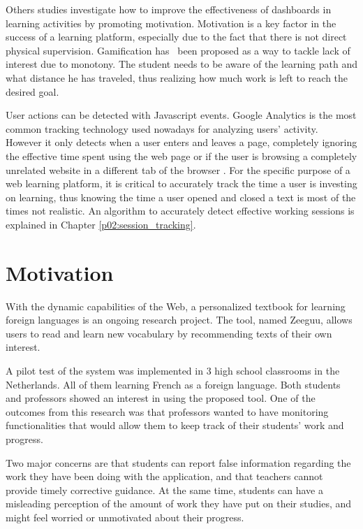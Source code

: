 Others studies investigate how to improve the effectiveness of dashboards in learning activities by promoting motivation. Motivation is a key factor in the success of a learning platform, especially due to the fact that there is not direct physical supervision. Gamification \cite{Gonzalez2014} has \ been proposed as a way to tackle lack of interest due to monotony. The student needs to be aware of the learning path and what distance he has traveled, thus realizing how much work is left to reach the desired goal.

User actions can be detected with Javascript events. Google Analytics is the most common tracking technology used nowadays for analyzing users' activity. However it only detects when a user enters and leaves a page, completely ignoring the effective time spent using the web page or if the user is browsing a completely unrelated website in a different tab of the browser \cite{GoogleAnalytics01} \cite{MisunderstoodMetrics}. For the specific purpose of a web learning platform, it is critical to accurately track the time a user is investing on learning, thus knowing the time a user opened and closed a text is most of the times not realistic. An algorithm to accurately detect effective working sessions is explained in Chapter \ref{p02:session_tracking}.

\section{Motivation}
With the dynamic capabilities of the Web, a personalized textbook for learning foreign languages \cite{Mircea2018} \cite{Lungu16} is an ongoing research project. The tool, named Zeeguu, allows users to read and learn new vocabulary by recommending texts of their own interest. 

A pilot test of the system was implemented in 3 high school classrooms in the Netherlands. All of them learning French as a foreign language. Both students and professors showed an interest in using the proposed tool. One of the outcomes from this research was that professors wanted to have monitoring functionalities that would allow them to keep track of their students' work and progress.

Two major concerns are that students can report false information regarding the work they have been doing with the application, and that teachers cannot provide timely corrective guidance. At the same time, students can have a misleading perception of the amount of work they have put on their studies, and might feel worried or unmotivated about their progress.

